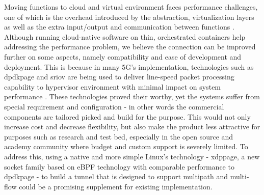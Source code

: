 Moving functions to cloud and virtual environment faces performance challenges, one of which is the overhead introduced by the abstraction, virtualization layers as well as the extra input/output and communication between functions \cite{yousaf_nfv_sdn_key_techno_for_5g2017}.
Although running cloud-native software on thin, orchestrated containers help addressing the performance problem, we believe the connection can be improved further on some aspects, namely compatibility and ease of development and deployment.
This is because in many 5G's implementation, technologies such as \ac{dpdkpage} and \ac{sriov} are being used to deliver line-speed packet processing capability to hypervisor environment with minimal impact on system performance \cite{intel_dpdk_perf}\cite{nec_hite_paper_upf_perf}\cite{openstack_sriov}\cite{zte_5g_core_upf_impl}.
These technologies proved their worthy, yet the systems suffer from special requirement and configuration - in other words the commercial components are tailored picked and build for the purpose.
This would not only increase cost and decrease flexibility, but also make the product less attractive for purposes such as research and test bed, especially in the open source and academy community where budget and custom support is severely limited.
To address this, using a native and more simple Linux's technology - \ac{xdppage}, a new socket family based on eBPF technology with comparable performance to \ac{dpdkpage} - to build a tunnel that is designed to support multipath and multi-flow could be a promising supplement for existing implementation. 


